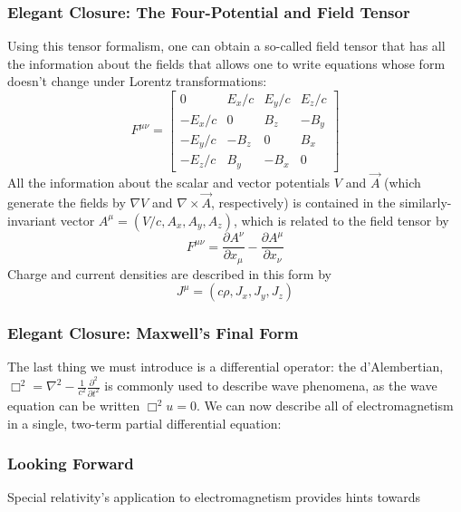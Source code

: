 \documentclass[10pt]{beamer}
\begin{document}
\begin{frame}
  \frametitle{Elegant Closure: The Four-Potential and Field Tensor}
  Using this tensor formalism, one can obtain a so-called field tensor that has all the information about the fields that allows one to write equations whose form doesn't change under Lorentz transformations:
  \[
    F^{\mu\nu}=
    \begin{bmatrix}
      0 & E_{x}/c & E_{y}/c & E_{z}/c \\
      -E_{x}/c & 0 & B_{z} & -B_{y} \\
      -E_{y}/c & -B_{z} & 0 & B_{x} \\
      -E_{z}/c & B_{y} & -B_{x} & 0
    \end{bmatrix}
  \]
  All the information about the scalar and vector potentials $V$ and $\vec{A}$ (which generate the fields by $\nabla V$ and $\nabla\times \vec{A}$, respectively) is contained in the similarly-invariant vector $A^{\mu}=(V/c,A_{x},A_{y},A_{z})$,
  which is related to the field tensor by
  \[
    F^{\mu\nu}=\frac{\partial A^{\nu}}{\partial x_{\mu}}-\frac{\partial A^{\mu}}{\partial x_{\nu}}
  \]
  Charge and current densities are described in this form by
  \[
    J^{\mu}=(c\rho,J_{x},J_{y},J_{z})
  \]
\end{frame}

\begin{frame}
  \frametitle{Elegant Closure: Maxwell's Final Form}
  The last thing we must introduce is a differential operator: the d'Alembertian, $\Box^{2}=\nabla^{2}-\frac{1}{c^{2}}\frac{\partial^{2}}{\partial t^{2}}$ is commonly used to describe wave phenomena, as the wave equation can be written $\Box^{2} u=0$.
  We can now describe all of electromagnetism in a single, two-term partial differential equation:
  \begin{center}
  \end{center}
\end{frame}

\begin{frame}
  \frametitle{Looking Forward}
  Special relativity's application to electromagnetism provides hints towards
\end{frame}
\end{document}
